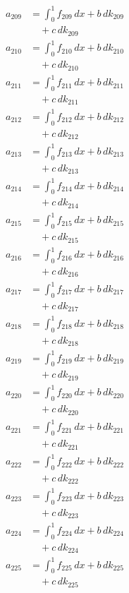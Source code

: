 \documentclass{article}
\begin{document}
\begin{align}
a_{209} &= \int_0^1 f_{209}\,dx + b\,dk_{209} \\
&\quad + c\,dk_{209} \\
a_{210} &= \int_0^1 f_{210}\,dx + b\,dk_{210} \\
&\quad + c\,dk_{210} \\
a_{211} &= \int_0^1 f_{211}\,dx + b\,dk_{211} \\
&\quad + c\,dk_{211} \\
a_{212} &= \int_0^1 f_{212}\,dx + b\,dk_{212} \\
&\quad + c\,dk_{212} \\
a_{213} &= \int_0^1 f_{213}\,dx + b\,dk_{213} \\
&\quad + c\,dk_{213} \\
a_{214} &= \int_0^1 f_{214}\,dx + b\,dk_{214} \\
&\quad + c\,dk_{214} \\
a_{215} &= \int_0^1 f_{215}\,dx + b\,dk_{215} \\
&\quad + c\,dk_{215} \\
a_{216} &= \int_0^1 f_{216}\,dx + b\,dk_{216} \\
&\quad + c\,dk_{216} \\
a_{217} &= \int_0^1 f_{217}\,dx + b\,dk_{217} \\
&\quad + c\,dk_{217} \\
a_{218} &= \int_0^1 f_{218}\,dx + b\,dk_{218} \\
&\quad + c\,dk_{218} \\
a_{219} &= \int_0^1 f_{219}\,dx + b\,dk_{219} \\
&\quad + c\,dk_{219} \\
a_{220} &= \int_0^1 f_{220}\,dx + b\,dk_{220} \\
&\quad + c\,dk_{220} \\
a_{221} &= \int_0^1 f_{221}\,dx + b\,dk_{221} \\
&\quad + c\,dk_{221} \\
a_{222} &= \int_0^1 f_{222}\,dx + b\,dk_{222} \\
&\quad + c\,dk_{222} \\
a_{223} &= \int_0^1 f_{223}\,dx + b\,dk_{223} \\
&\quad + c\,dk_{223} \\
a_{224} &= \int_0^1 f_{224}\,dx + b\,dk_{224} \\
&\quad + c\,dk_{224} \\
a_{225} &= \int_0^1 f_{225}\,dx + b\,dk_{225} \\
&\quad + c\,dk_{225} \\

\end{align}
\end{document}
